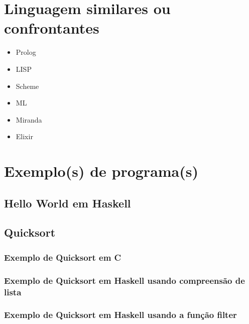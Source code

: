 \documentclass[
  12pt,				         %
  oneside,			       %
  a4paper,			       %
  english,		       	 %
  brazil,			      	 %
]{abntex2}
\begin{document}
    \chapter{Linguagem similares ou confrontantes}

    \begin{itemize}
      \item Prolog
      \item LISP 
      \item Scheme 
      \item ML 
      \item Miranda 
      \item Elixir 
    \end{itemize}

    \newpage

    \chapter{Exemplo(s) de programa(s)}

      \setcounter{section}{0}

      \section{Hello World em Haskell}
      

      \section{Quicksort}
      \subsection{Exemplo de Quicksort em C}

      
      \subsection{Exemplo de Quicksort em Haskell usando compreensão de lista} 

            

      \newpage

      \subsection{Exemplo de Quicksort em Haskell usando a função filter}
\end{document}

